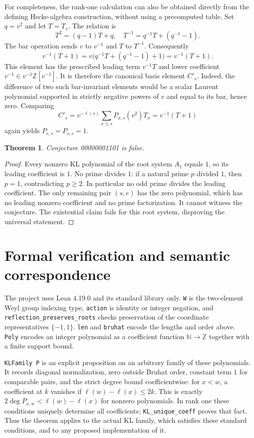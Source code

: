 \documentclass[11pt]{article}
\newtheorem{theorem}{Theorem}
\begin{document}
For completeness, the rank-one calculation can also be obtained directly
from the defining Hecke-algebra construction, without using a precomputed
table. Set $q=v^2$ and let $T=T_s$. The relation is
\[
T^2=(q-1)T+q,
\quad T^{-1}=q^{-1}T+(q^{-1}-1).
\]
The bar operation sends $v$ to $v^{-1}$ and $T$ to $T^{-1}$. Consequently
\[
\overline{v^{-1}(T+1)}
=v\bigl(q^{-1}T+(q^{-1}-1)+1\bigr)
=v^{-1}(T+1).
\]
This element has the prescribed leading term $v^{-1}T$ and lower
coefficient $v^{-1}\in v^{-1}\mathbb Z[v^{-1}]$. It is therefore the
canonical basis element $C'_s$. Indeed, the difference of two such
bar-invariant elements would be a scalar Laurent polynomial supported
in strictly negative powers of $v$ and equal to its bar, hence zero.
Comparing
\[
C'_s=v^{-\ell(s)}\sum_{x\leq s}P_{x,s}(v^2)T_x
=v^{-1}(T+1)
\]
again yields $P_{e,s}=P_{s,s}=1$.

\begin{theorem}
Conjecture 00000001101 is false.
\end{theorem}
\begin{proof}
Every nonzero KL polynomial of the root system $A_1$ equals $1$, so its
leading coefficient is $1$. No prime divides $1$: if a natural prime $p$
divided $1$, then $p=1$, contradicting $p\geq2$. In particular no odd
prime divides the leading coefficient. The only remaining pair $(s,e)$
has the zero polynomial, which has no leading nonzero coefficient and
no prime factorization. It cannot witness the conjecture. The existential
claim fails for this root system, disproving the universal statement.
\end{proof}

\section{Formal verification and semantic correspondence}
The project uses Lean 4.19.0 and its standard library only.
\texttt{W} is the two-element Weyl group indexing type, \texttt{action}
is identity or integer negation, and \texttt{reflection\_preserves\_roots}
checks preservation of the coordinate representatives $\{-1,1\}$.
\texttt{len} and \texttt{bruhat} encode the lengths and order above.
\texttt{Poly} encodes an integer polynomial as a coefficient function
$\mathbb N\to\mathbb Z$ together with a finite support bound.

\texttt{KLFamily P} is an explicit proposition on an arbitrary family
of these polynomials. It records diagonal normalization, zero outside
Bruhat order, constant term $1$ for comparable pairs, and the strict
degree bound coefficientwise: for $x<w$, a coefficient at $k$ vanishes
if $\ell(w)-\ell(x)\leq2k$. This is exactly
$2\deg P_{x,w}<\ell(w)-\ell(x)$ for nonzero polynomials.
In rank one these conditions uniquely determine all coefficients;
\texttt{KL\_unique\_coeff} proves that fact. Thus the theorem applies
to the actual KL family, which satisfies these standard conditions,
and to any proposed implementation of it.
\end{document}

